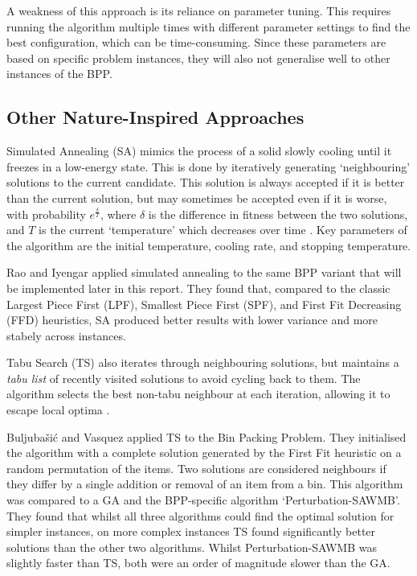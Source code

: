 \documentclass[conference]{IEEEtran}
\begin{document}
A weakness of this approach is its reliance on parameter tuning. This requires running the algorithm multiple times with different parameter settings to find the best configuration, which can be time-consuming. Since these parameters are based on specific problem instances, they will also not generalise well to other instances of the BPP.

\subsection{Other Nature-Inspired Approaches}
Simulated Annealing (SA) mimics the process of a solid slowly cooling until it freezes in a low-energy state. This is done by iteratively generating `neighbouring' solutions to the current candidate. This solution is always accepted if it is better than the current solution, but may sometimes be accepted even if it is worse, with probability \(e^{\frac{\delta}{T}}\), where \(\delta\) is the difference in fitness between the two solutions, and \(T\) is the current `temperature' which decreases over time \cite{bertsimas1993simulated}. Key parameters of the algorithm are the initial temperature, cooling rate, and stopping temperature.

Rao and Iyengar \cite{rao1994bin} applied simulated annealing to the same BPP variant that will be implemented later in this report. They found that, compared to the classic Largest Piece First (LPF), Smallest Piece First (SPF), and First Fit Decreasing (FFD) heuristics, SA produced better results with lower variance and more stabely across instances.

Tabu Search (TS) also iterates through neighbouring solutions, but maintains a \textit{tabu list} of recently visited solutions to avoid cycling back to them. The algorithm selects the best non-tabu neighbour at each iteration, allowing it to escape local optima \cite{glover1989tabu}.

Buljubašić and Vasquez \cite{buljubasic2016consistent} applied TS to the Bin Packing Problem. They initialised the algorithm with a complete solution generated by the First Fit heuristic on a random permutation of the items. Two solutions are considered neighbours if they differ by a single addition or removal of an item from a bin. This algorithm was compared to a GA and the BPP-specific algorithm `Perturbation-SAWMB'. They found that whilst all three algorithms could find the optimal solution for simpler instances, on more complex instances TS found significantly better solutions than the other two algorithms. Whilst Perturbation-SAWMB was slightly faster than TS, both were an order of magnitude slower than the GA.
\end{document}
